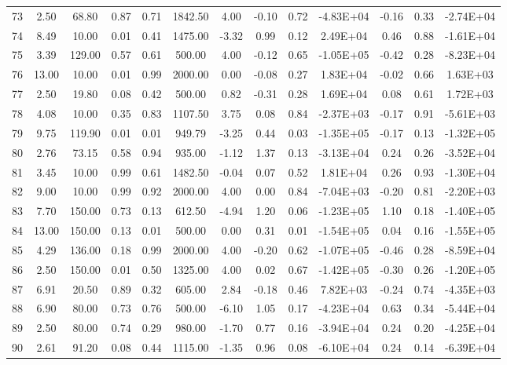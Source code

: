 \begin{landscape}
\begin{center}
\begin{longtable}{|c|c|c|c|c|c|c|c|c|c|c|c|c|}
73 & 2.50  & 68.80  & 0.87 & 0.71 & 1842.50 & 4.00  & -0.10 & 0.72 & -4.83E+04 & -0.16 & 0.33 & -2.74E+04 \\
74 & 8.49  & 10.00  & 0.01 & 0.41 & 1475.00 & -3.32 & 0.99  & 0.12 & 2.49E+04  & 0.46  & 0.88 & -1.61E+04 \\
75 & 3.39  & 129.00 & 0.57 & 0.61 & 500.00  & 4.00  & -0.12 & 0.65 & -1.05E+05 & -0.42 & 0.28 & -8.23E+04 \\
76 & 13.00 & 10.00  & 0.01 & 0.99 & 2000.00 & 0.00  & -0.08 & 0.27 & 1.83E+04  & -0.02 & 0.66 & 1.63E+03  \\
77 & 2.50  & 19.80  & 0.08 & 0.42 & 500.00  & 0.82  & -0.31 & 0.28 & 1.69E+04  & 0.08  & 0.61 & 1.72E+03  \\
78 & 4.08  & 10.00  & 0.35 & 0.83 & 1107.50 & 3.75  & 0.08  & 0.84 & -2.37E+03 & -0.17 & 0.91 & -5.61E+03 \\
79 & 9.75  & 119.90 & 0.01 & 0.01 & 949.79  & -3.25 & 0.44  & 0.03 & -1.35E+05 & -0.17 & 0.13 & -1.32E+05 \\
80 & 2.76  & 73.15  & 0.58 & 0.94 & 935.00  & -1.12 & 1.37  & 0.13 & -3.13E+04 & 0.24  & 0.26 & -3.52E+04 \\
81 & 3.45  & 10.00  & 0.99 & 0.61 & 1482.50 & -0.04 & 0.07  & 0.52 & 1.81E+04  & 0.26  & 0.93 & -1.30E+04 \\
82 & 9.00  & 10.00  & 0.99 & 0.92 & 2000.00 & 4.00  & 0.00  & 0.84 & -7.04E+03 & -0.20 & 0.81 & -2.20E+03 \\
83 & 7.70  & 150.00 & 0.73 & 0.13 & 612.50  & -4.94 & 1.20  & 0.06 & -1.23E+05 & 1.10  & 0.18 & -1.40E+05 \\
84 & 13.00 & 150.00 & 0.13 & 0.01 & 500.00  & 0.00  & 0.31  & 0.01 & -1.54E+05 & 0.04  & 0.16 & -1.55E+05 \\
85 & 4.29  & 136.00 & 0.18 & 0.99 & 2000.00 & 4.00  & -0.20 & 0.62 & -1.07E+05 & -0.46 & 0.28 & -8.59E+04 \\
86 & 2.50  & 150.00 & 0.01 & 0.50 & 1325.00 & 4.00  & 0.02  & 0.67 & -1.42E+05 & -0.30 & 0.26 & -1.20E+05 \\
87 & 6.91  & 20.50  & 0.89 & 0.32 & 605.00  & 2.84  & -0.18 & 0.46 & 7.82E+03  & -0.24 & 0.74 & -4.35E+03 \\
88 & 6.90  & 80.00  & 0.73 & 0.76 & 500.00  & -6.10 & 1.05  & 0.17 & -4.23E+04 & 0.63  & 0.34 & -5.44E+04 \\
89 & 2.50  & 80.00  & 0.74 & 0.29 & 980.00  & -1.70 & 0.77  & 0.16 & -3.94E+04 & 0.24  & 0.20 & -4.25E+04 \\
90 & 2.61  & 91.20  & 0.08 & 0.44 & 1115.00 & -1.35 & 0.96  & 0.08 & -6.10E+04 & 0.24  & 0.14 & -6.39E+04 \\

\end{longtable}
\end{center}
\end{landscape}
